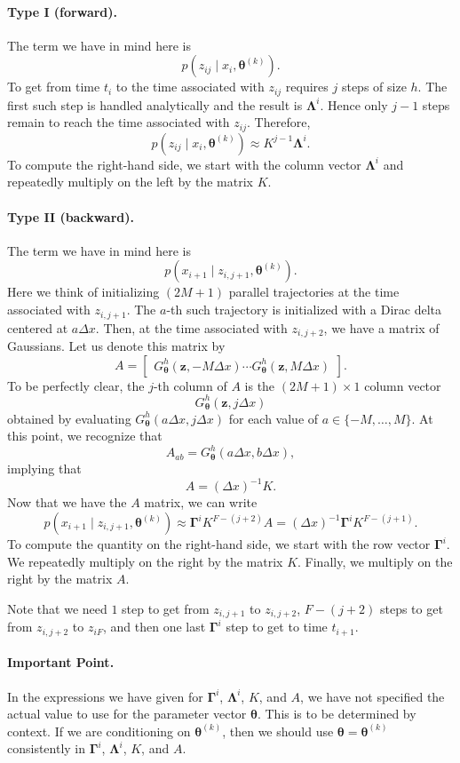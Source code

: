 \documentclass[12pt]{article}
\newcommand{\btheta}{\ensuremath{\boldsymbol{\theta}}}
\newcommand{\bLambda}{\ensuremath{\boldsymbol{\Lambda}}}
\newcommand{\bGamma}{\ensuremath{\boldsymbol{\Gamma}}}
\begin{document}
\paragraph{Type I (forward).} The term we have in mind here is
$$
p(z_{ij} \mid x_i, \btheta^{(k)}).
$$
To get from time $t_i$ to the time associated with $z_{ij}$ requires $j$ steps of size $h$.  The first such step is handled analytically and the result is $\bLambda^i$.  Hence only $j-1$ steps remain to reach the time associated with $z_{ij}$.  Therefore,
$$
p(z_{ij} \mid x_i, \btheta^{(k)}) \approx K^{j-1} \bLambda^i.
$$
To compute the right-hand side, we start with the column vector $\bLambda^i$ and repeatedly multiply on the left by the matrix $K$.

\paragraph{Type II (backward).} The term we have in mind here is
$$
p(x_{i+1} \mid z_{i,j+1}, \btheta^{(k)}).
$$
Here we think of initializing $(2M+1)$ parallel trajectories at the time 
associated with $z_{i,j+1}$.  The $a$-th such trajectory is initialized with a Dirac delta centered at $a \Delta x$.  Then, at the time associated with $z_{i,j+2}$, we have a matrix of Gaussians.  Let us denote this matrix by
$$
A = \begin{bmatrix} G^h_{\btheta}( \mathbf{z}, -M \Delta x) \cdots
G^h_{\btheta}( \mathbf{z}, M \Delta x ) \end{bmatrix}.
$$
To be perfectly clear, the $j$-th column of $A$ is the $(2M+1) \times 1$ column vector
$$
G^h_{\btheta}( \mathbf{z}, j \Delta x)
$$
obtained by evaluating $G^h_{\btheta}( a \Delta x, j \Delta x)$ for each value of $a \in \{-M, \ldots, M\}$.  At this point, we  recognize that$$
A_{ab} = G^h_{\btheta} ( a \Delta x, b \Delta x),
$$
implying that
$$
A = (\Delta x)^{-1} K.
$$
Now that we have the $A$ matrix, we can write
$$
p(x_{i+1} \mid z_{i,j+1}, \btheta^{(k)}) \approx \bGamma^i K^{F - (j+2)} A 
= (\Delta x)^{-1} \bGamma^i  K^{F - (j + 1)}.
$$
To compute the quantity on the right-hand side, we start with the row vector $\bGamma^i$.  We repeatedly multiply on the right by the matrix $K$.  Finally, we multiply on the right by the matrix $A$.

Note that we need $1$ step to get from $z_{i,j+1}$ to $z_{i,j+2}$, $F-(j+2)$ steps to get from $z_{i,j+2}$ to $z_{iF}$, and then one last $\bGamma^i$ step to get to time $t_{i+1}$.

\paragraph{Important Point.} In the expressions we have given for $\bGamma^i$, $\bLambda^i$, $K$, and $A$, we have not specified the actual value to use for the parameter vector $\btheta$.  This is to be determined by context.  If we are conditioning on $\btheta^{(k)}$, then we should use $\btheta = \btheta^{(k)}$ consistently in $\bGamma^i$, $\bLambda^i$, $K$, and $A$.
\end{document}

